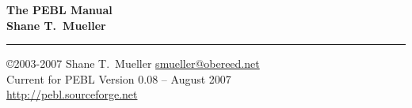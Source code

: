 \documentclass[10pt,twoside,openright,titlepage,letter]{book}
\begin{document}
\begin{center}
\LARGE
\textbf{The PEBL Manual} \\
\vspace{0.7cm}\Large \textbf{Shane T.~Mueller}
\end{center}
\rule{\textwidth}{1mm}


\vspace{.4cm}

\normalsize
\noindent\copyright 2003-2007 Shane T.~Mueller \href{mailto:smueller@obereed.net}{smueller@obereed.net}\\
Current for PEBL Version 0.08 -- August 2007 \\
\href{http://pebl.sourceforge.net}{http://pebl.sourceforge.net}
\tableofcontents

\clearpage
{}











\appendix
\end{document}
